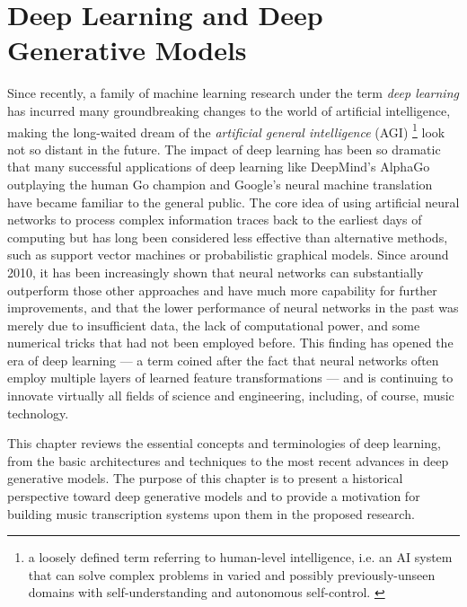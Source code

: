 
\graphicspath{{3-deeplearning/figures/}}

\chapter{Deep Learning and Deep Generative Models}\label{sec:deeplearning}
\label{ch:deeplearning}

Since recently, a family of machine learning research under the term \emph{deep learning} has incurred many groundbreaking changes to the world of artificial intelligence, making the long-waited dream of the \emph{artificial general intelligence} (AGI) \footnote{a loosely defined term referring to human-level intelligence, i.e. an AI system that can solve complex problems in varied and possibly previously-unseen domains with self-understanding and autonomous self-control. \cite{goertzel2007agi}} look not so distant in the future.
The impact of deep learning has been so dramatic that many successful applications of deep learning like DeepMind's AlphaGo outplaying the human Go champion and Google's neural machine translation have became familiar to the general public.
The core idea of using artificial neural networks to process complex information traces back to the earliest days of computing \cite{kleene1951representation} but has long been considered less effective than alternative methods, such as support vector machines or probabilistic graphical models.
Since around 2010, it has been increasingly shown that neural networks can substantially outperform those other approaches and have much more capability for further improvements, and that the lower performance of neural networks in the past was merely due to insufficient data, the lack of computational power, and some numerical tricks that had not been employed before.
This finding has opened the era of deep learning --- a term coined after the fact that neural networks often employ multiple layers of learned feature transformations --- and is continuing to innovate virtually all fields of science and engineering, including, of course, music technology.

This chapter reviews the essential concepts and terminologies of deep learning, from the basic architectures and techniques to the most recent advances in deep generative models.
The purpose of this chapter is to present a historical perspective toward deep generative models and to provide a motivation for building music transcription systems upon them in the proposed research.



